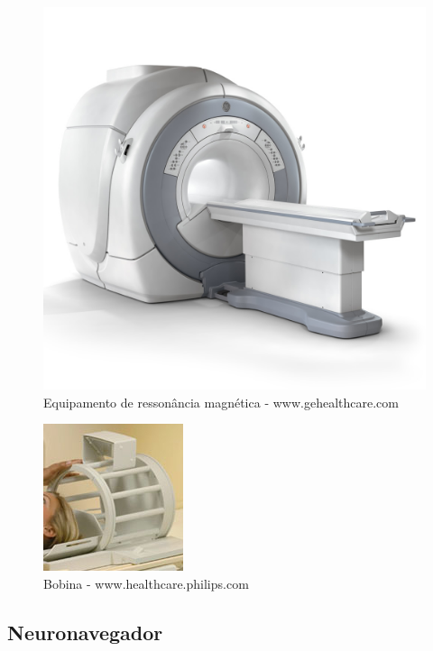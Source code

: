  
\begin{figure}[!htb]
\centering
\includegraphics[scale=0.2]{img/rm_ge.jpg}
\caption{Equipamento de ressonância magnética - www.gehealthcare.com}
\end{figure}

\begin{figure}[!htb]
\centering
\includegraphics[scale=0.8]{img/bobina.jpg}
\caption{Bobina - www.healthcare.philips.com}
\end{figure}

\subsection{Neuronavegador}
\label{sec:neuronavegador_intro}

